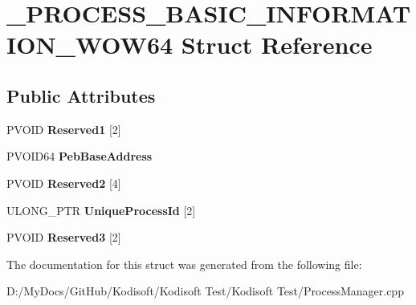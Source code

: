 \hypertarget{struct___p_r_o_c_e_s_s___b_a_s_i_c___i_n_f_o_r_m_a_t_i_o_n___w_o_w64}{\section{\+\_\+\+P\+R\+O\+C\+E\+S\+S\+\_\+\+B\+A\+S\+I\+C\+\_\+\+I\+N\+F\+O\+R\+M\+A\+T\+I\+O\+N\+\_\+\+W\+O\+W64 Struct Reference}
\label{struct___p_r_o_c_e_s_s___b_a_s_i_c___i_n_f_o_r_m_a_t_i_o_n___w_o_w64}
}
\subsection*{Public Attributes}
\begin{DoxyCompactItemize}
\item 
\hypertarget{struct___p_r_o_c_e_s_s___b_a_s_i_c___i_n_f_o_r_m_a_t_i_o_n___w_o_w64_a76d2b713a1fc15eb28740b8d92c329a7}{P\+V\+O\+I\+D {\bfseries Reserved1} \mbox{[}2\mbox{]}}\label{struct___p_r_o_c_e_s_s___b_a_s_i_c___i_n_f_o_r_m_a_t_i_o_n___w_o_w64_a76d2b713a1fc15eb28740b8d92c329a7}

\item 
\hypertarget{struct___p_r_o_c_e_s_s___b_a_s_i_c___i_n_f_o_r_m_a_t_i_o_n___w_o_w64_ae608541a30cf81b28d987454f2a41d2d}{P\+V\+O\+I\+D64 {\bfseries Peb\+Base\+Address}}\label{struct___p_r_o_c_e_s_s___b_a_s_i_c___i_n_f_o_r_m_a_t_i_o_n___w_o_w64_ae608541a30cf81b28d987454f2a41d2d}

\item 
\hypertarget{struct___p_r_o_c_e_s_s___b_a_s_i_c___i_n_f_o_r_m_a_t_i_o_n___w_o_w64_a97857e0cf153a2b02267bf909aab37b3}{P\+V\+O\+I\+D {\bfseries Reserved2} \mbox{[}4\mbox{]}}\label{struct___p_r_o_c_e_s_s___b_a_s_i_c___i_n_f_o_r_m_a_t_i_o_n___w_o_w64_a97857e0cf153a2b02267bf909aab37b3}

\item 
\hypertarget{struct___p_r_o_c_e_s_s___b_a_s_i_c___i_n_f_o_r_m_a_t_i_o_n___w_o_w64_af871edc4d0bb2dee56c2464028739fda}{U\+L\+O\+N\+G\+\_\+\+P\+T\+R {\bfseries Unique\+Process\+Id} \mbox{[}2\mbox{]}}\label{struct___p_r_o_c_e_s_s___b_a_s_i_c___i_n_f_o_r_m_a_t_i_o_n___w_o_w64_af871edc4d0bb2dee56c2464028739fda}

\item 
\hypertarget{struct___p_r_o_c_e_s_s___b_a_s_i_c___i_n_f_o_r_m_a_t_i_o_n___w_o_w64_aa726c8cc84e924b0b0fddf1f34708526}{P\+V\+O\+I\+D {\bfseries Reserved3} \mbox{[}2\mbox{]}}\label{struct___p_r_o_c_e_s_s___b_a_s_i_c___i_n_f_o_r_m_a_t_i_o_n___w_o_w64_aa726c8cc84e924b0b0fddf1f34708526}

\end{DoxyCompactItemize}


The documentation for this struct was generated from the following file\+:\begin{DoxyCompactItemize}
\item 
D\+:/\+My\+Docs/\+Git\+Hub/\+Kodisoft/\+Kodisoft Test/\+Kodisoft Test/Process\+Manager.\+cpp\end{DoxyCompactItemize}

